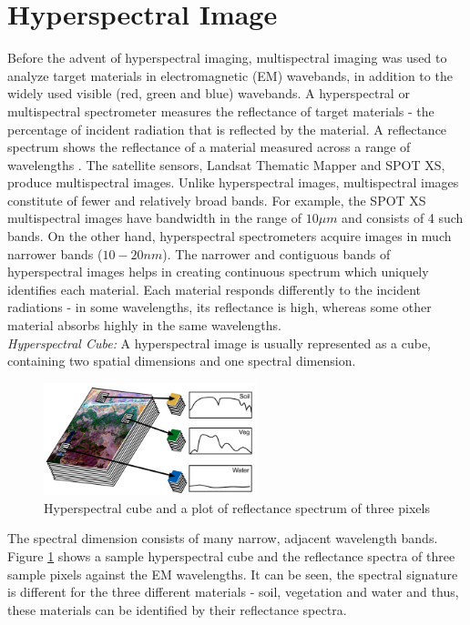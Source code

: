 \documentclass[12pt,twoside]{article}
\theoremstyle{plain}
\theoremstyle{definition}
\theoremstyle{remark}
\newcommand{\forceindent}{\leavevmode{\parindent=2em\indent}}
\begin{document}
\section{Hyperspectral Image}
\label{sec:HypTheo}
Before the advent of hyperspectral imaging, multispectral imaging was used to analyze target materials in electromagnetic (EM) wavebands, in addition to the widely used visible (red, green and blue) wavebands. A hyperspectral or multispectral spectrometer measures the reflectance of target materials - the percentage of incident radiation that is reflected by the material. A reflectance spectrum shows the reflectance of a material measured across a range of wavelengths \cite{shippert2003introduction}. The satellite sensors, Landsat Thematic Mapper and SPOT XS,  produce multispectral images. Unlike hyperspectral images, multispectral images constitute of fewer  and relatively broad bands. For example, the SPOT XS multispectral images have bandwidth in the range of $10 \mu m$ and consists of 4 such bands. On the other hand, hyperspectral spectrometers acquire images in much narrower bands ($10-20nm$). The narrower and contiguous bands of hyperspectral images helps in creating continuous spectrum which uniquely identifies each material. Each material responds differently to the incident radiations - in some wavelengths, its reflectance is high, whereas some other material absorbs highly in the same wavelengths.\\
\forceindent \textit{Hyperspectral Cube:} A hyperspectral image is usually represented as a cube, containing two spatial dimensions and one spectral dimension. 
\begin{figure}
\includegraphics[width=0.55\textwidth]{src/Hyperspectral_cube.png}
\caption{Hyperspectral cube and a plot of reflectance spectrum of three pixels \cite{shippert2003introduction}}
\label{fig:hyp_cube}
\end{figure}
The spectral dimension consists of many narrow, adjacent wavelength bands. Figure \ref{fig:hyp_cube} shows a sample hyperspectral cube and the reflectance spectra of three sample pixels against the EM wavelengths. It can be seen, the spectral signature is different for the three different materials - soil, vegetation and water and thus, these materials can be identified by their reflectance spectra.
\end{document}

